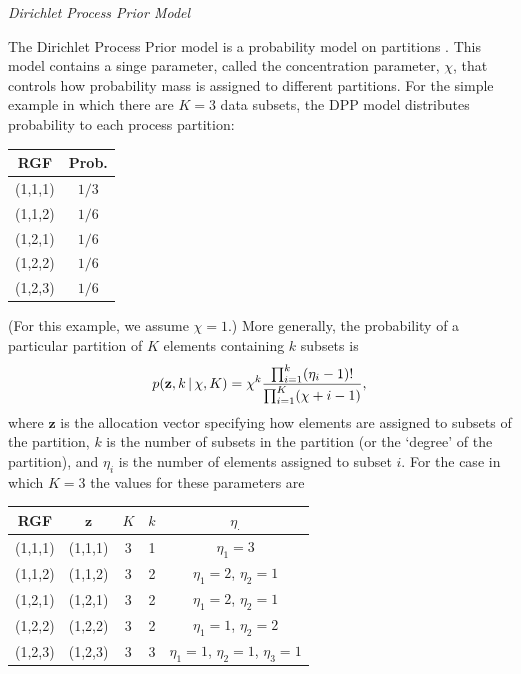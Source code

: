 \documentclass[11pt]{article}
\newcommand{\given}{\ensuremath{\,|\,}}
\begin{document}
\bigskip

\begin{center}
{\it Dirichlet Process Prior Model}
\end{center}

The Dirichlet Process Prior model is a probability model on partitions \citep{ferguson73,antoniak74}.
This model contains a singe parameter, called the concentration parameter, $\chi$, that controls how probability mass is assigned to different partitions.
For the simple example in which there are $K=3$ data subsets, the DPP model distributes probability to each process partition:
\begin{center}
\begin{tabular}{cc}
RGF     & Prob. \\ \hline
(1,1,1) & $1/3$ \\
(1,1,2) & $1/6$ \\
(1,2,1) & $1/6$ \\
(1,2,2) & $1/6$ \\
(1,2,3) & $1/6$ \\
\end{tabular}
\end{center}
(For this example, we assume $\chi = 1$.)
More generally, the probability of a particular partition of $K$ elements containing $k$ subsets is
\begin{align}
p({\mathbf z}, k \given \chi, K) = \chi^k { \prod_{i=1}^k(\eta_i - 1)! \over \prod_{i=1}^K (\chi + i -1) },
\end{align}
where ${\mathbf z}$ is the allocation vector specifying how elements are assigned to subsets of the partition, $k$ is the number of subsets in the partition (or the `degree' of the partition), and $\eta_i$ is the number of elements assigned to subset $i$. For the case in which $K=3$ the values for these parameters are
\begin{center}
\begin{tabular}{ccccc}
RGF     & ${\mathbf z}$ & $K$ & $k$ & $\eta_{\cdot}$ \\ \hline
(1,1,1) & (1,1,1) & 3 & 1 & $\eta_1=3$ \\
(1,1,2) & (1,1,2) & 3 & 2 & $\eta_1=2$, $\eta_2=1$ \\
(1,2,1) & (1,2,1) & 3 & 2 & $\eta_1=2$, $\eta_2=1$ \\
(1,2,2) & (1,2,2) & 3 & 2 & $\eta_1=1$, $\eta_2=2$ \\
(1,2,3) & (1,2,3) & 3 & 3 & $\eta_1=1$, $\eta_2=1$, $\eta_3=1$ \\
\end{tabular}
\end{center}
\end{document}
